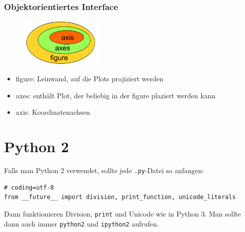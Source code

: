 \subsubsection{Objektorientiertes Interface}
\begin{figure}
  \includegraphics[width=150px]{img/matplotlib_v.png}
\end{figure}
\begin{itemize}
  \item figure: Leinwand, auf die Plots projiziert werden
  \item axes: enthält Plot, der beliebig in der figure plaziert werden kann
  \item axis: Koordinatenachsen 
\end{itemize}

\section{Python 2}
Falls man Python 2 verwendet, sollte jede \texttt{.py}-Datei so anfangen:
\begin{verbatim}
# coding=utf-8
from __future__ import division, print_function, unicode_literals
\end{verbatim}
Dann funktionieren Division, \texttt{print} und Unicode wie in Python 3.
Man sollte dann auch immer \texttt{python2} und \texttt{ipython2} aufrufen.

